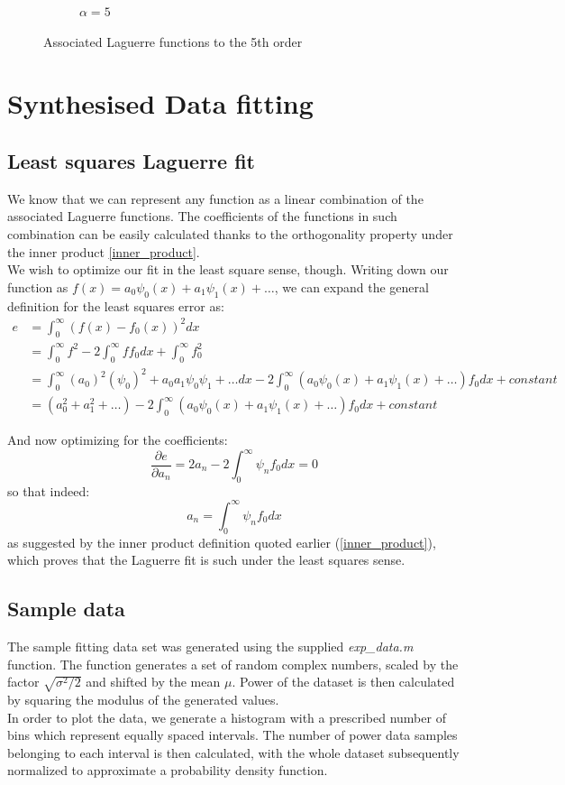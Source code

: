 \documentclass[a4paper]{article}
\numberwithin{equation}{section}
\begin{document}
\begin{figure}[!ht]
\begin{subfigure}[t]{.45\textwidth}
		\caption{$\alpha=5$}
	\end{subfigure}
	\caption{Associated Laguerre functions to the 5th order}
    \label{fig:associatedlaguerre}
\end{figure}

\section{Synthesised Data fitting}

\subsection{Least squares Laguerre fit}
We know that we can represent any function as a linear combination of the associated Laguerre functions. The coefficients of the functions in such combination can be easily calculated thanks to the orthogonality property under the inner product \ref{inner_product}.\\
We wish to optimize our fit in the least square sense, though. Writing down our function as $f(x)=a_0\psi_0(x)+a_1\psi_1(x)+\ldots$, we can expand the general definition for the least squares error as:
\begin{align}
e &= \int_{0}^{\infty} (f(x)-f_0(x))^2dx \\
  &= \int_{0}^{\infty} f^2 - 2 \int_{0}^{\infty} f f_0 dx + \int_{0}^{\infty} f_0^2 \\
  &= \int_{0}^{\infty} (a_0)^2(\psi_0)^2 + a_0a_1\psi_0\psi_1 + \ldots dx - 2 \int_{0}^{\infty} (a_0\psi_0(x)+a_1\psi_1(x)+\ldots)f_0 dx + constant \\
  &= (a_0^2+a_1^2+\ldots) - 2 \int_{0}^{\infty} (a_0\psi_0(x)+a_1\psi_1(x)+\ldots)f_0 dx + constant
\end{align}

\noindent And now optimizing for the coefficients:
\begin{equation}
\frac{\partial e}{\partial a_n} = 2a_n - 2 \int_{0}^{\infty} \psi_nf_0dx = 0
\end{equation}
so that indeed:
\begin{equation}
a_n = \int_{0}^{\infty} \psi_nf_0dx
\end{equation}
as suggested by the inner product definition quoted earlier (\ref{inner_product}), which proves that the Laguerre fit is such under the least squares sense.

\subsection{Sample data}
The sample fitting data set was generated using the supplied \textit{exp\_data.m} function.
The function generates a set of random complex numbers, scaled by the factor $\sqrt{\sigma^2/2}$ and shifted by the mean $\mu$. Power of the dataset is then calculated by squaring the modulus of the generated values. \\
In order to plot the data, we generate a histogram with a prescribed number of bins which represent equally spaced intervals. The number of power data samples belonging to each interval is then calculated, with the whole dataset subsequently normalized to approximate a probability density function.
\end{document}
